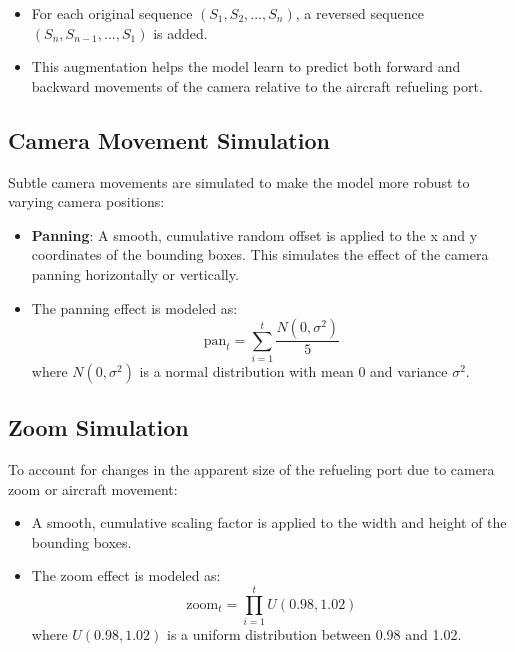 \documentclass[12pt,oneside]{book} %
\begin{document}
\begin{itemize}
    \item For each original sequence $(S_1, S_2, ..., S_n)$, a reversed sequence $(S_n,
              S_{n-1}, ..., S_1)$ is added.
    \item This augmentation helps the model learn to predict both forward and backward
          movements of the camera relative to the aircraft refueling port.
\end{itemize}

\subsection{Camera Movement Simulation}

Subtle camera movements are simulated to make the model more robust to varying
camera positions:

\begin{itemize}
    \item \textbf{Panning}: A smooth, cumulative random offset is applied to the x and y coordinates of the bounding boxes. This simulates the effect of the camera panning horizontally or vertically.
    \item The panning effect is modeled as:
          \begin{equation}
              \text{pan}_t = \sum_{i=1}^t \frac{N(0, \sigma^2)}{5}
          \end{equation}
          where $N(0, \sigma^2)$ is a normal distribution with mean 0 and variance $\sigma^2$.
\end{itemize}

\subsection{Zoom Simulation}

To account for changes in the apparent size of the refueling port due to camera
zoom or aircraft movement:

\begin{itemize}
    \item A smooth, cumulative scaling factor is applied to the width and height of the
          bounding boxes.
    \item The zoom effect is modeled as:
          \begin{equation}
              \text{zoom}_t = \prod_{i=1}^t U(0.98, 1.02)
          \end{equation}
          where $U(0.98, 1.02)$ is a uniform distribution between 0.98 and 1.02.
\end{itemize}
\end{document}
